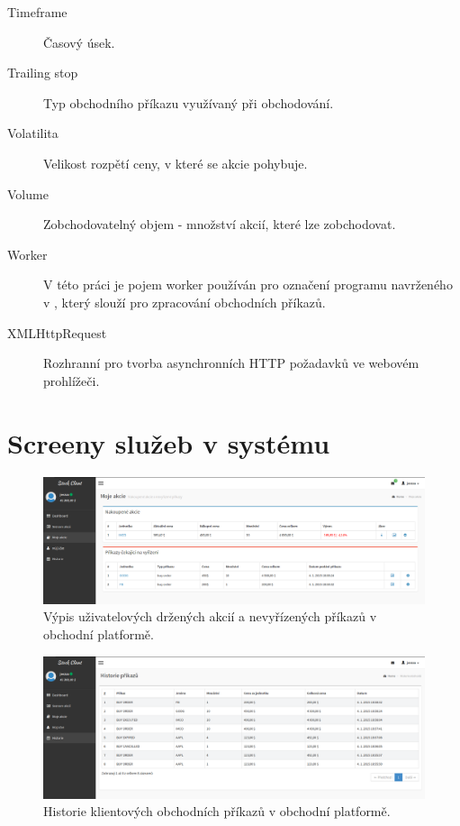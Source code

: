 \documentclass[thesis=M,czech]{FITthesis}[2012/06/26]
\begin{document}
\begin{description}
	\item[Timeframe] Časový úsek.

	\item[Trailing stop] Typ obchodního příkazu využívaný při obchodování.

	\item[Volatilita] Velikost rozpětí ceny, v které se akcie pohybuje.

	\item[Volume] Zobchodovatelný objem - množství akcií, které lze zobchodovat.

	\item[Worker] V této práci je pojem worker používán pro označení programu navrženého v \cite{Fremunt2014}, který slouží pro zpracování obchodních příkazů.

	\item[XMLHttpRequest] Rozhranní pro tvorba asynchronních HTTP požadavků ve webovém prohlížeči.

\end{description}


\chapter{Screeny služeb v systému}
\label{chap:screens}

\begin{figure}[h]
	\centering
	\includegraphics[width=1\textwidth]{images/screeny/moje_akcie}
 	\caption[Výpis uživatelových držených akcií a nevyřízených příkazů]{Výpis uživatelových držených akcií a nevyřízených příkazů v obchodní platformě.}
 	\label{fig:debugger}
\end{figure}


\begin{figure}[h]
	\centering
	\includegraphics[width=1\textwidth]{images/screeny/historie}
 	\caption[Historie klientových obchodních příkazů v obchodní platformě]{Historie klientových obchodních příkazů v obchodní platformě.}
 	\label{fig:debugger}
\end{figure}
\end{document}
